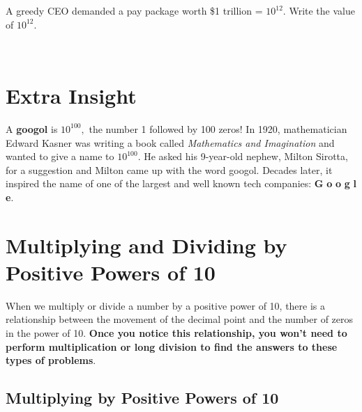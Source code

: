 \documentclass{ximera}
\begin{document}
\begin{problem} A greedy CEO demanded a pay package worth \$1 trillion = $10^{12}.$  Write the value of $10^{12}.$

  ~ \\[3em]  %

\begin{multipleChoice}
  \end{multipleChoice}

\end{problem}

\insightIcon{}

\section*{Extra Insight}

A \textbf{googol} is $10^{100},$ the number 1 followed by 100 zeros!  In 1920, mathematician Edward Kasner was writing a book 
called \emph{Mathematics and Imagination} and wanted to give a name to $10^{100}.$  He asked his 9-year-old nephew, Milton Sirotta, 
for a suggestion and Milton came up with the word googol.  Decades later, it inspired the name of one of the largest 
and well known tech companies: \textcolor{googleblue}{\textbf{G}}%
\textcolor{googlered}{\textbf{o}}%
\textcolor{googleyellow}{\textbf{o}}%
\textcolor{googleblue}{\textbf{g}}%
\textcolor{googlegreen}{\textbf{l}}%
\textcolor{googlered}{\textbf{e}}.


\section*{Multiplying and Dividing by Positive Powers of 10}

When we multiply or divide a number by a positive power of 10, there is a relationship between the movement of the decimal point and the number of zeros
in the power of 10.  \textbf{Once you notice this relationship, you won't need to perform multiplication or long division to find the answers 
to these types of problems}.


\subsection*{Multiplying by Positive Powers of 10}
\end{document}
